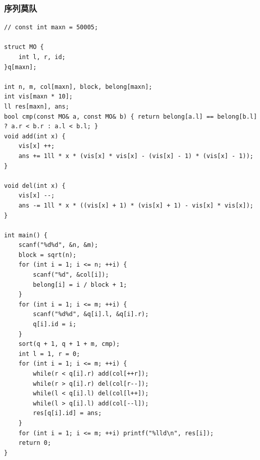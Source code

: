 \documentclass[twoside]{article}
\begin{document}
\subsubsection{序列莫队}
\begin{lstlisting}
// const int maxn = 50005;

struct MO {
    int l, r, id;
}q[maxn];

int n, m, col[maxn], block, belong[maxn];
int vis[maxn * 10];
ll res[maxn], ans;
bool cmp(const MO& a, const MO& b) { return belong[a.l] == belong[b.l] ? a.r < b.r : a.l < b.l; }
void add(int x) {
    vis[x] ++;
    ans += 1ll * x * (vis[x] * vis[x] - (vis[x] - 1) * (vis[x] - 1));
}

void del(int x) {
    vis[x] --;
    ans -= 1ll * x * ((vis[x] + 1) * (vis[x] + 1) - vis[x] * vis[x]);
}

int main() {
    scanf("%d%d", &n, &m);
    block = sqrt(n);
    for (int i = 1; i <= n; ++i) {
        scanf("%d", &col[i]);
        belong[i] = i / block + 1;
    }
    for (int i = 1; i <= m; ++i) {
        scanf("%d%d", &q[i].l, &q[i].r);
        q[i].id = i;
    }
    sort(q + 1, q + 1 + m, cmp);
    int l = 1, r = 0;
    for (int i = 1; i <= m; ++i) {
        while(r < q[i].r) add(col[++r]);
        while(r > q[i].r) del(col[r--]);
        while(l < q[i].l) del(col[l++]);
        while(l > q[i].l) add(col[--l]);
        res[q[i].id] = ans;
    }
    for (int i = 1; i <= m; ++i) printf("%lld\n", res[i]);
    return 0;
}\end{lstlisting}
\end{document}
